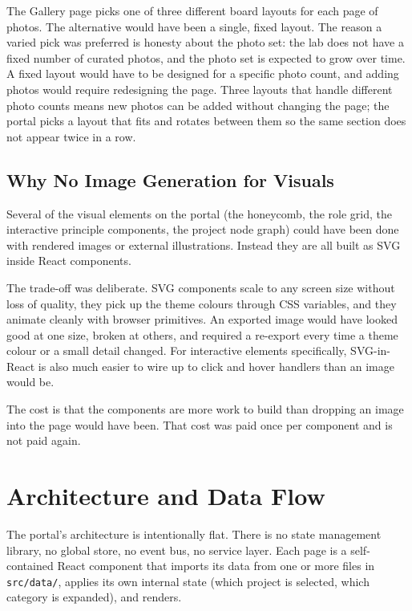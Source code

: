 The Gallery page picks one of three different board layouts for each page of photos. The alternative would have been a single, fixed layout. The reason a varied pick was preferred is honesty about the photo set: the lab does not have a fixed number of curated photos, and the photo set is expected to grow over time. A fixed layout would have to be designed for a specific photo count, and adding photos would require redesigning the page. Three layouts that handle different photo counts means new photos can be added without changing the page; the portal picks a layout that fits and rotates between them so the same section does not appear twice in a row.

\subsection{Why No Image Generation for Visuals}\label{subsec:dev-design-visuals}

Several of the visual elements on the portal (the honeycomb, the role grid, the interactive principle components, the project node graph) could have been done with rendered images or external illustrations. Instead they are all built as SVG inside React components.

The trade-off was deliberate. SVG components scale to any screen size without loss of quality, they pick up the theme colours through CSS variables, and they animate cleanly with browser primitives. An exported image would have looked good at one size, broken at others, and required a re-export every time a theme colour or a small detail changed. For interactive elements specifically, SVG-in-React is also much easier to wire up to click and hover handlers than an image would be.

The cost is that the components are more work to build than dropping an image into the page would have been. That cost was paid once per component and is not paid again.

\section{Architecture and Data Flow}\label{sec:dev-architecture}

The portal's architecture is intentionally flat. There is no state management library, no global store, no event bus, no service layer. Each page is a self-contained React component that imports its data from one or more files in \texttt{src/data/}, applies its own internal state (which project is selected, which category is expanded), and renders.

